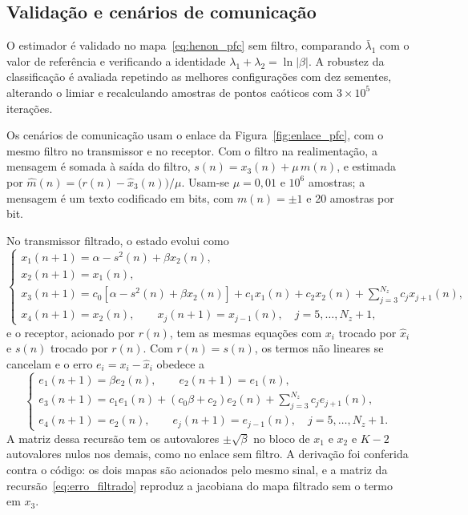 \documentclass{pfccefsa}
\begin{document}
\subsection{Validação e cenários de comunicação}
\label{sub:cenarios}

O estimador é validado no mapa~\eqref{eq:henon_pfc} sem filtro, comparando
$\bar\lambda_1$ com o valor de referência \cite{Sprott2003} e verificando a
identidade $\lambda_1+\lambda_2=\ln|\beta|$. A robustez da classificação é
avaliada repetindo as melhores configurações com dez sementes, alterando o
limiar e recalculando amostras de pontos caóticos com $3\times10^5$ iterações.

Os cenários de comunicação usam o enlace da Figura~\ref{fig:enlace_pfc}, com o
mesmo filtro no transmissor e no receptor. Com o filtro na realimentação, a mensagem é
somada à saída do filtro, $s(n)=x_3(n)+\mu\,m(n)$, e estimada por
$\hat m(n)=\bigl(r(n)-\hat x_3(n)\bigr)/\mu$. Usam-se $\mu=0{,}01$ e $10^6$ amostras; a mensagem é um texto codificado em
bits, com $m(n)=\pm1$ e 20 amostras por bit.

No transmissor filtrado, o estado evolui como
\begin{equation}
  \begin{cases}
    x_1(n+1)=\alpha-s^2(n)+\beta x_2(n),\\
    x_2(n+1)=x_1(n),\\
    x_3(n+1)=c_0[\alpha-s^2(n)+\beta x_2(n)]+c_1x_1(n)+c_2x_2(n)
      +\sum_{j=3}^{N_z}c_jx_{j+1}(n),\\
    x_4(n+1)=x_2(n),\qquad x_j(n+1)=x_{j-1}(n),\quad j=5,\ldots,N_z+1,
  \end{cases}
  \label{eq:tx_estado_filtrado}
\end{equation}
e o receptor, acionado por $r(n)$, tem as mesmas equações com $x_i$ trocado por
$\hat x_i$ e $s(n)$ trocado por $r(n)$. Com $r(n)=s(n)$, os termos não lineares
se cancelam e o erro $e_i=x_i-\hat x_i$ obedece a
\begin{equation}
  \begin{cases}
    e_1(n+1)=\beta e_2(n),\qquad e_2(n+1)=e_1(n),\\
    e_3(n+1)=c_1e_1(n)+(c_0\beta+c_2)e_2(n)+\sum_{j=3}^{N_z}c_je_{j+1}(n),\\
    e_4(n+1)=e_2(n),\qquad e_j(n+1)=e_{j-1}(n),\quad j=5,\ldots,N_z+1.
  \end{cases}
  \label{eq:erro_filtrado}
\end{equation}
A matriz dessa recursão tem os autovalores $\pm\sqrt{\beta}$ no bloco de
$x_1$ e $x_2$ e $K-2$ autovalores nulos nos demais, como no enlace sem filtro.
A derivação foi conferida contra o código: os dois mapas são acionados pelo
mesmo sinal, e a matriz da recursão~\eqref{eq:erro_filtrado} reproduz a jacobiana do mapa
filtrado sem o termo em $x_3$.
\end{document}
